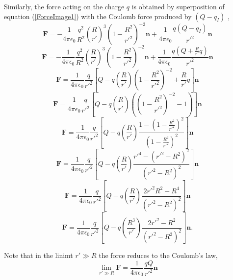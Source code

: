Similarly, the force acting on the charge $q$ is obtained by superposition of equation (\ref{ForceImage1}) with the Coulomb  force produced by $(Q-q_I)$ ,
\begin{equation}
\textbf{F} = -\frac{1}{4\pi \epsilon_0} \frac{q^2}{R^2}  \left( \frac{R}{r'}  \right)^3 \left( 1 - \frac{R^2}{r'^2}\right)^{-2} \textbf{n} + \frac{1}{4\pi \epsilon_0} \frac{q(Q-q_I)}{r'^2} \textbf{n}
\end{equation}
\begin{equation}
\textbf{F} = - \frac{1}{4\pi \epsilon_0} \frac{q^2}{R^2}  \left( \frac{R}{r'}  \right)^3 \left( 1 - \frac{R^2}{r'^2}\right)^{-2} \textbf{n} + \frac{1}{4\pi \epsilon_0} \frac{q(Q+ \frac{R}{r'}q)}{r'^2} \textbf{n}
\end{equation}
\begin{equation}
\textbf{F} = \frac{1}{4\pi \epsilon_0}  \frac{q}{r'^2} \left[Q - q \left( \frac{R}{r'}  \right) \left( 1 - \frac{R^2}{r'^2}\right)^{-2} + \frac{R}{r'}q \right] \textbf{n}
\end{equation}
\begin{equation}
\textbf{F} = \frac{1}{4\pi \epsilon_0}  \frac{q}{r'^2} \left[Q - q \left( \frac{R}{r'}  \right) \left(   \left( 1 - \frac{R^2}{r'^2}\right)^{-2} -1 \right) \right] \textbf{n}
\end{equation}
\begin{equation}
\textbf{F} = \frac{1}{4\pi \epsilon_0}  \frac{q}{r'^2} \left[ Q - q \left( \frac{R}{r'} \right)  \frac{1 - \left(1 - \frac{R^2}{r'^2}\right)^{2} }{ \left( 1 - \frac{R^2}{r'^2}\right)^2 }   \right] \textbf{n}
\end{equation}
\begin{equation}
\textbf{F}= \frac{1}{4\pi \epsilon_0}  \frac{q}{r'^2} \left[ Q - q \left( \frac{R}{r'} \right)  \frac{r'^4 - \left(r'^2 - R^2 \right)^{2} }{ \left( r'^2 - R^2 \right)^2 }   \right] \textbf{n}
\end{equation}
\begin{equation}
\textbf{F}= \frac{1}{4\pi \epsilon_0}  \frac{q}{r'^2} \left[ Q - q \left( \frac{R}{r'} \right)  \frac{ 2 r'^2 R^2 - R^4  }{ \left( r'^2 - R^2 \right)^2 }   \right] \textbf{n}
\end{equation}
\begin{equation}
\textbf{F}= \frac{1}{4\pi \epsilon_0}  \frac{q}{r'^2} \left[ Q - q \left( \frac{R^3}{r'} \right)  \frac{ 2 r'^2 - R^2  }{ \left( r'^2 - R^2 \right)^2 }   \right] \textbf{n}.
\end{equation}

Note that in the linimt $r' \gg R$ the force reduces to the Coulomb's law,
\begin{equation}
\lim_{r' \gg R} \textbf{F}  =  \frac{1}{4\pi \epsilon_0}  \frac{qQ}{r'^2} \textbf{n}
\end{equation}





